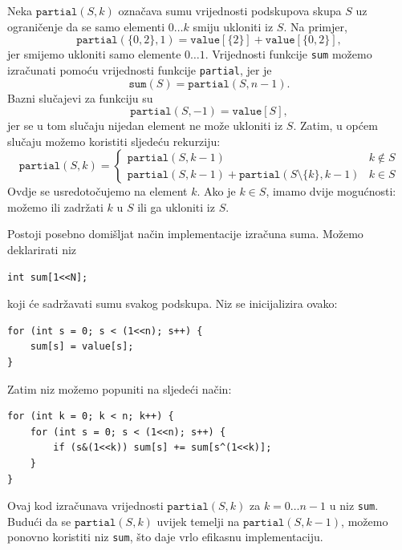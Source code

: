 Neka $\texttt{partial}(S,k)$ označava sumu
vrijednosti podskupova skupa $S$ uz ograničenje
da se samo elementi $0 \ldots k$
smiju ukloniti iz $S$.
Na primjer,
\[\texttt{partial}(\{0,2\},1)=\texttt{value}[\{2\}]+\texttt{value}[\{0,2\}],\]
jer smijemo ukloniti samo elemente $0 \ldots 1$.
Vrijednosti funkcije \texttt{sum} možemo izračunati pomoću
vrijednosti funkcije \texttt{partial}, jer je
\[\texttt{sum}(S) = \texttt{partial}(S,n-1).\]
Bazni slučajevi za funkciju su
\[\texttt{partial}(S,-1)=\texttt{value}[S],\]
jer se u tom slučaju nijedan element ne može ukloniti iz $S$.
Zatim, u općem slučaju možemo koristiti sljedeću rekurziju:
\begin{equation*}
    \texttt{partial}(S,k) = \begin{cases}
               \texttt{partial}(S,k-1) & k \notin S \\
               \texttt{partial}(S,k-1) + \texttt{partial}(S \setminus \{k\},k-1) & k \in S
           \end{cases}
\end{equation*}
Ovdje se usredotočujemo na element $k$.
Ako je $k \in S$, imamo dvije mogućnosti: možemo ili zadržati $k$ u $S$
ili ga ukloniti iz $S$.

Postoji posebno domišljat način implementacije
izračuna suma. Možemo deklarirati niz
\begin{lstlisting}
int sum[1<<N];
\end{lstlisting}
koji će sadržavati sumu svakog podskupa.
Niz se inicijalizira ovako:
\begin{lstlisting}
for (int s = 0; s < (1<<n); s++) {
    sum[s] = value[s];
}
\end{lstlisting}
Zatim niz možemo popuniti na sljedeći način:
\begin{lstlisting}
for (int k = 0; k < n; k++) {
    for (int s = 0; s < (1<<n); s++) {
        if (s&(1<<k)) sum[s] += sum[s^(1<<k)];
    }
}
\end{lstlisting}
Ovaj kod izračunava vrijednosti $\texttt{partial}(S,k)$
za $k=0 \ldots n-1$ u niz \texttt{sum}.
Budući da se $\texttt{partial}(S,k)$ uvijek temelji na
$\texttt{partial}(S,k-1)$, možemo ponovno koristiti niz
\texttt{sum}, što daje vrlo efikasnu implementaciju.
